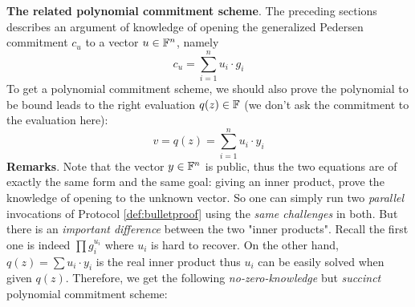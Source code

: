 \documentclass{article}
\begin{document}
\textbf{The related polynomial commitment scheme}. The preceding sections describes an argument of knowledge of opening the generalized Pedersen commitment $c_u$ to a vector $u \in \mathbb{F}^n$, namely
\begin{equation*}
c_u = \sum_{i = 1}^n u_i \cdot g_i
\end{equation*}
To get a polynomial commitment scheme, we should also prove the polynomial to be bound leads to the right evaluation $q(z) \in \mathbb{F}$ (we don't ask the commitment to the evaluation here):
\begin{equation*}
v = q(z) = \sum_{i = 1}^n u_i \cdot y_i
\end{equation*}
\textbf{Remarks}. Note that the vector $y \in \mathbb{F}^n$ is public, thus the two equations are of exactly the same form and the same goal: giving an inner product, prove the knowledge of opening to the unknown vector. So one can simply run two \textit{parallel} invocations of Protocol \ref{def:bulletproof} using the \textit{same challenges} in both.  But there is an \textit{important difference} between the two "inner products". Recall the first one is indeed $\prod g_i^{u_i}$ where $u_i$ is hard to recover. On the other hand, $q(z) = \sum u_i \cdot y_i$ is the real inner product thus $u_i$ can be easily solved when given $q(z)$. Therefore, we get the following \textit{no-zero-knowledge} but \textit{succinct} polynomial commitment scheme:
\end{document}

